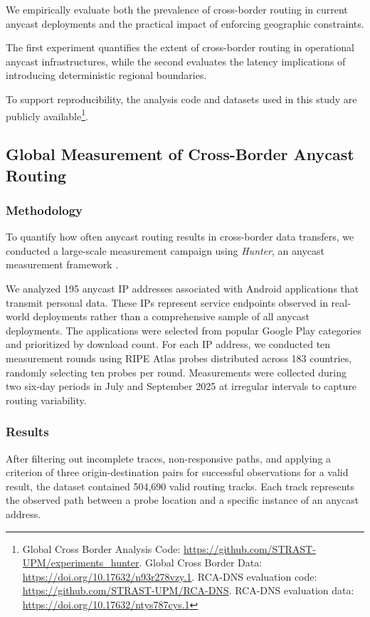 \documentclass[acmsmall]{acmart}
\begin{document}
We empirically evaluate both the prevalence of cross-border routing in current anycast deployments and the practical impact of enforcing geographic constraints.

The first experiment quantifies the extent of cross-border routing in operational anycast infrastructures, while the second evaluates the latency implications of introducing deterministic regional boundaries.

To support reproducibility, the analysis code and datasets used in this study are publicly available\footnote{Global Cross Border Analysis Code: \url{https://github.com/STRAST-UPM/experiments_hunter}. Global Cross Border Data: \url{https://doi.org/10.17632/n93r278vzy.1}. RCA-DNS evaluation code: \url{https://github.com/STRAST-UPM/RCA-DNS}. RCA-DNS evaluation data: \url{https://doi.org/10.17632/ntys787cys.1}}.

\subsection{Global Measurement of Cross-Border Anycast Routing}

\subsubsection{Methodology}

To quantify how often anycast routing results in cross-border data transfers, we conducted a large-scale measurement campaign using \emph{Hunter}, an anycast measurement framework \cite{Pascual2025AnycastDisaster}.

We analyzed 195 anycast IP addresses associated with Android applications that transmit personal data. These IPs represent service endpoints observed in real-world deployments rather than a comprehensive sample of all anycast deployments. The applications were selected from popular Google Play categories and prioritized by download count. For each IP address, we conducted ten measurement rounds using RIPE Atlas probes distributed across 183 countries, randomly selecting ten probes per round. Measurements were collected during two six-day periods in July and September 2025 at irregular intervals to capture routing variability.

\subsubsection{Results}

After filtering out incomplete traces, non-responsive paths, and applying a criterion of three origin-destination pairs for successful observations for a valid result, the dataset contained 504,690 valid routing tracks. Each track represents the observed path between a probe location and a specific instance of an anycast address.
\end{document}
